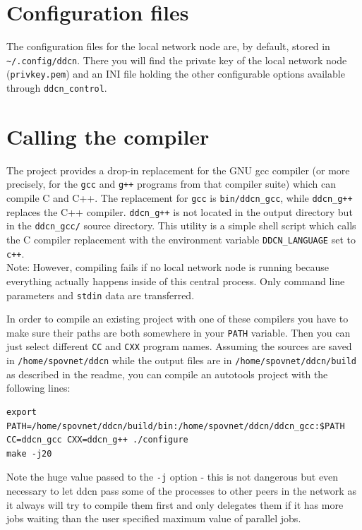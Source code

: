 \documentclass[a4paper,9pt]{scrartcl}
\begin{document}
\section{Configuration files}

The configuration files for the local network node are, by default, stored in \texttt{\textasciitilde/.config/ddcn}. There you will find the private key of the local network node (\texttt{privkey.pem}) and an INI file holding the other configurable options available through \texttt{ddcn\_control}.

\section{Calling the compiler}

The project provides a drop-in replacement for the GNU gcc compiler (or more precisely, for the \texttt{gcc} and \texttt{g++} programs from that compiler suite) which can compile C and C++. The replacement for \texttt{gcc} is \texttt{bin/ddcn\_gcc}, while \texttt{ddcn\_g++} replaces the C++ compiler. \texttt{ddcn\_g++} is not located in the output directory but in the \texttt{ddcn\_gcc/} source directory. This utility is a simple shell script which calls the C compiler replacement with the environment variable \texttt{DDCN\_LANGUAGE} set to \texttt{c++}.\\
Note: However, compiling fails if no local network node is running because everything actually happens inside of this central process. Only command line parameters and \texttt{stdin} data are transferred.\\
\smallskip

In order to compile an existing project with one of these compilers you have to make sure their paths are both somewhere in your \texttt{PATH} variable. Then you can just select different \texttt{CC} and \texttt{CXX} program names. Assuming the sources are saved in \texttt{/home/spovnet/ddcn} while the output files are in \texttt{/home/spovnet/ddcn/build} as described in the readme, you can compile an autotools project with the following lines:

\begin{verbatim}
export PATH=/home/spovnet/ddcn/build/bin:/home/spovnet/ddcn/ddcn_gcc:$PATH
CC=ddcn_gcc CXX=ddcn_g++ ./configure
make -j20
\end{verbatim} 

Note the huge value passed to the \texttt{-j} option - this is not dangerous but even necessary to let ddcn pass some of the processes to other peers in the network as it always will try to compile them first and only delegates them if it has more jobs waiting than the user specified maximum value of parallel jobs.
\end{document}
